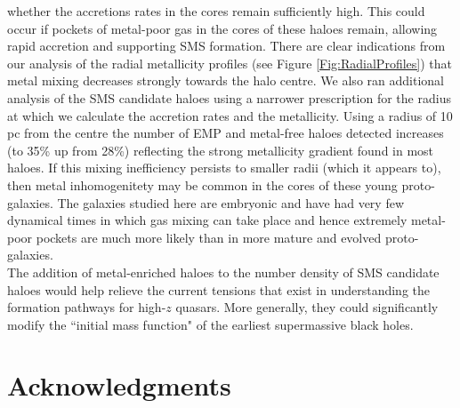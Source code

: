 \documentclass[graphics, twocolumn, usenatbib]{mn2e}
\begin{document}
whether the accretions rates in the cores remain sufficiently high.  This could occur if pockets
of metal-poor gas in the cores of these haloes remain, allowing rapid accretion and supporting SMS
formation. There are clear indications from our analysis of the radial metallicity profiles
(see Figure \ref{Fig:RadialProfiles}) that metal mixing decreases strongly towards the halo centre.
We also ran additional analysis of the SMS candidate haloes using a narrower prescription for the
radius at which we calculate the accretion rates and the metallicity. Using a radius of 10 pc
from the centre the number of EMP and metal-free haloes detected increases (to 35\% up from 28\%)
reflecting the strong metallicity gradient found in most haloes. 
If this mixing inefficiency persists to smaller radii (which it appears to),
then metal inhomogenitety may be common in the cores of these young proto-galaxies. The galaxies studied here are
embryonic and have had very few dynamical times in which 
gas mixing can take place and hence extremely metal-poor pockets are much more likely than in more mature and evolved proto-galaxies.\\
\indent  The addition of metal-enriched haloes to the number density of SMS
candidate haloes would help relieve the current tensions that exist in understanding the formation pathways for high-$z$ quasars. More generally, they could significantly modify the ``initial mass function" of the earliest supermassive black holes.

\section*{Acknowledgments}
\end{document}
